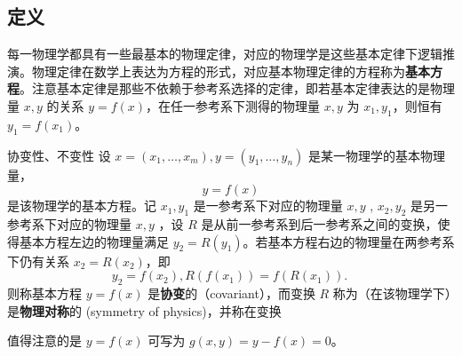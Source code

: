 \subsection{定义}
每一物理学都具有一些最基本的物理定律，对应的物理学是这些基本定律下逻辑推演。物理定律在数学上表达为方程的形式，对应基本物理定律的方程称为\textbf{基本方程}。注意基本定律是那些不依赖于参考系选择的定律，即若基本定律表达的是物理量 $x,y$ 的关系 $y=f(x)$，在任一参考系下测得的物理量 $x,y$ 为 $x_1,y_1$，则恒有 $y_1=f(x_1)$。
\begin{definition}{协变性、不变性}
设 $x=(x_1,\ldots,x_m),y=(y_1,\ldots,y_n)$ 是某一物理学的基本物理量，
\begin{equation}
y=f(x)
\end{equation}
是该物理学的基本方程。记 $x_1,y_1$ 是一参考系下对应的物理量 $x,y$ , $x_2,y_2$ 是另一参考系下对应的物理量 $x,y$ ，设 $R$ 是从前一参考系到后一参考系之间的变换，使得基本方程左边的物理量满足 $y_2=R(y_1)$。若基本方程右边的物理量在两参考系下仍有关系 $x_2=R(x_2)$，即
\begin{equation}
y_2=f(x_2),R(f(x_1))=f(R(x_1)).~
\end{equation}
则称基本方程 $y=f(x)$ 是\textbf{协变}的（covariant），而变换 $R$ 称为（在该物理学下）是\textbf{物理对称}的 (symmetry of physics)，并称在变换
\end{definition}

值得注意的是 $y=f(x)$ 可写为 $g(x,y)=y-f(x)=0$。













